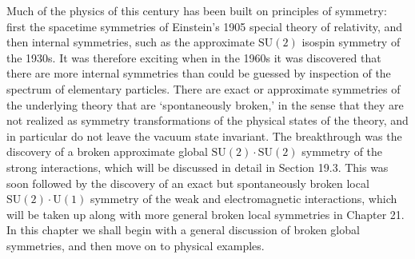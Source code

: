 
Much of the physics of this century has been built on principles of
symmetry: first the spacetime symmetries of Einstein's 1905 special theory
of relativity, and then internal symmetries, such as the approximate
$\mathrm{SU}(2)$ isospin symmetry of the 1930s. It was therefore exciting
when in the 1960s it was discovered that there are more internal symmetries
than could be guessed by inspection of the spectrum of elementary particles.
There are exact or approximate symmetries of the underlying theory that are
`spontaneously broken,' in the sense that they are not realized as symmetry
transformations of the physical states of the theory, and in particular do
not leave the vacuum state invariant. The breakthrough was the discovery of
a broken approximate global $\mathrm{SU}(2)\cdot\mathrm{SU}(2)$ symmetry of
the strong interactions, which will be discussed in detail in Section 19.3.
This was soon followed by the discovery of an exact but spontaneously broken
local $\mathrm{SU}(2)\cdot\mathrm{U}(1)$ symmetry of the weak and
electromagnetic interactions, which will be taken up along with more general
broken local symmetries in Chapter 21. In this chapter we shall begin with a
general discussion of broken global symmetries, and then move on to physical
examples.
